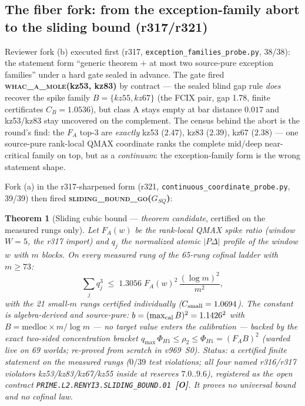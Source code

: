 \documentclass[11pt]{article}
\newcommand{\mO}{\textcolor{openred}{\textbf{[O]}}}
\newtheorem{theorem}{Theorem}[section]
\theoremstyle{definition}
\theoremstyle{remark}
\begin{document}
\subsection{The fiber fork: from the exception-family abort to the
sliding bound (r317/r321)}\label{sec:slidingbound}

Reviewer fork (b) executed first (r317,
\texttt{exception\_families\_probe.py}, 38/38): the statement form
``generic theorem $+$ at most two source-pure exception families''
under a hard gate sealed in advance.  The gate fired
\textbf{\textsc{whac\_a\_mole}(kz53, kz83)} by contract --- the
sealed blind gap rule \emph{does} recover the spike family
$B = \{kz55, kz67\}$ (the FCIX pair, gap 1.78, finite certificates
$C_B = 1.0536$), but class A stays empty at bar distance $0.017$
and kz53/kz83 stay uncovered on the complement.  The census behind
the abort is the round's find: the $F_A$ top-3 are \emph{exactly}
kz53 ($2.47$), kz83 ($2.39$), kz67 ($2.38$) --- one source-pure
rank-local QMAX coordinate ranks the complete mid/deep
near-critical family on top, but as a \emph{continuum}: the
exception-family form is the wrong statement shape.

Fork (a) in the r317-sharpened form (r321,
\texttt{continuous\_coordinate\_probe.py}, 39/39) then fired
\textbf{\textsc{sliding\_bound\_go}($G_{SQ}$)}:

\begin{theorem}[Sliding cubic bound --- \emph{theorem candidate},
certified on the measured rungs only]\label{thm:slidingbound}
Let $F_A(w)$ be the rank-local QMAX spike ratio (window $W = 5$,
the r317 import) and $q_j$ the normalized atomic $|P\Delta|$
profile of the window $w$ with $m$ blocks.  On \emph{every measured
rung} of the 65-rung cofinal ladder with $m \ge 73$:
\[
  \sum_j q_j^3 \;\le\; 1.3056 \; F_A(w)^2 \, \frac{(\log m)^2}{m^2},
\]
with the 21 small-$m$ rungs certified individually
($C_{\rm small} = 1.0694$).  The constant is \emph{algebra-derived
and source-pure}: $b = (\max_{\rm cal} B)^2 = 1.1426^2$ with
$B = \mathrm{medloc} \times m/\log m$ --- no target value enters the
calibration --- backed by the exact two-sided concentration bracket
$q_{\max}\,\Phi_{H1} \le \rho_2 \le \Phi_{H1} = (F_A B)^2$
(warded live on 69 worlds; re-proved from scratch in v969~S0).
\emph{Status: a certified finite statement on the measured rungs
($0/39$ test violations; all four named r316/r317 violators
kz53/kz83/kz67/kz55 inside at reserves $7.0..9.6$), registered as
the open contract} \texttt{PRIME.L2.RENYI3.SLIDING\_BOUND.01}~\mO.
\emph{It proves no universal bound and no cofinal law.}
\end{theorem}
\end{document}
